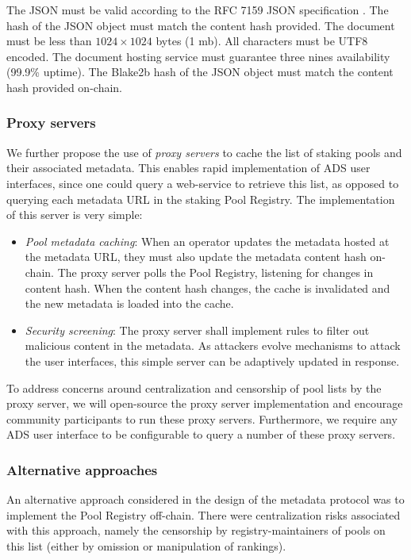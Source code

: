 The JSON must be valid according to the RFC 7159 JSON specification \cite{rfc7159}. The hash of the JSON object must match the content hash provided. The document must be less than $1024\times1024$ bytes (1 mb). All characters must be UTF8 encoded. The document hosting service must guarantee three nines availability (99.9\% uptime). The Blake2b hash of the JSON object must match the content hash provided on-chain. 

\subsubsection{Proxy servers}
We further propose the use of \textit{proxy servers} to cache the list of staking pools and their associated metadata. This enables rapid implementation of ADS user interfaces, since one could query a web-service to retrieve this list, as opposed to querying each metadata URL in the staking Pool Registry. The implementation of this server is very simple:
\begin{itemize}
    \item \textit{Pool metadata caching}: When an operator updates the metadata hosted at the metadata URL, they must also update the metadata content hash on-chain. The proxy server polls the Pool Registry, listening for changes in content hash. When the content hash changes, the cache is invalidated and the new metadata is loaded into the cache. 
    \item \textit{Security screening}: The proxy server shall implement rules to filter out malicious content in the metadata. As attackers evolve mechanisms to attack the user interfaces, this simple server can be adaptively updated in response. 
\end{itemize}

To address concerns around centralization and censorship of pool lists by the proxy server, we will open-source the proxy server implementation and encourage community participants to run these proxy servers. Furthermore, we require any ADS user interface to be configurable to query a number of these proxy servers.

\subsubsection{Alternative approaches} An alternative approach considered in the design of the metadata protocol was to implement the Pool Registry off-chain. There were centralization risks associated with this approach, namely the censorship by registry-maintainers of pools on this list (either by omission or manipulation of rankings). 

